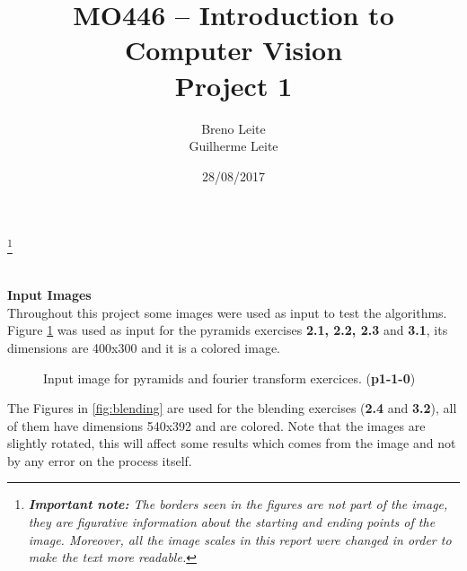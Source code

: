 \documentclass[12pt,a4paper]{article}
\title{MO446 -- Introduction to Computer Vision  \\ Project 1}
\author{Breno Leite  \\ Guilherme Leite}
\date{28/08/2017}
\newcommand\blfootnote[1]{%
	\begingroup
	\renewcommand\thefootnote{}\footnote{#1}%
	\addtocounter{footnote}{-1}%
	\endgroup
}
\begin{document}
\maketitle
\blfootnote{\textit{\textbf{Important note:} The borders seen in the figures are not part of the image, they are figurative information about the starting and ending points of the image. Moreover, all the image scales in this report were changed in order to make the text more readable.}} \\


\textbf{\LARGE Input Images}\\

Throughout this project some images were used as input to test the algorithms. Figure \ref{fig:p1-1-0} was used as input for the pyramids exercises \textbf{2.1, 2.2, 2.3} and \textbf{3.1}, its dimensions are 400x300 and it is a colored image. \\

\begin{figure}[!h]
	\centering
	{%
		\setlength{\fboxsep}{1pt}%
		\setlength{\fboxrule}{1pt}%
	}%
	\caption{Input image for pyramids and fourier transform exercices. (\textbf{p1-1-0})}
	\label{fig:p1-1-0}
\end{figure}

\newpage

The Figures in \ref{fig:blending} are used for the blending exercises (\textbf{2.4} and \textbf{3.2}), all of them have dimensions 540x392 and are colored. Note that the images are slightly rotated, this will affect some results which comes from the image and not by any error on the process itself. \\
\end{document}
